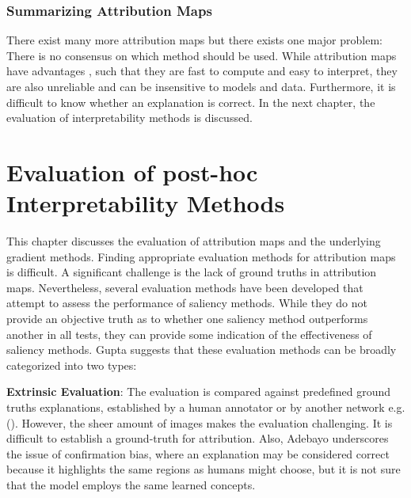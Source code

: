 
\subsection{Summarizing Attribution Maps}

There exist many more attribution maps but there exists one major problem: There is no consensus on which method should be used. While attribution maps have advantages \cite{molnar2022}, such that they are fast to compute and easy to interpret, they are also unreliable \cite{molnar2020} and can be insensitive to models and data. Furthermore, it is difficult to know whether an explanation is correct. In the next chapter, the evaluation of interpretability methods is discussed.

\newpage

\chapter{Evaluation of post-hoc Interpretability Methods}
\label{sec:evaluation}


This chapter discusses the evaluation of attribution maps and the underlying gradient methods. Finding appropriate evaluation methods for attribution maps is difficult. A significant challenge is the lack of ground truths in attribution maps. Nevertheless, several evaluation methods have been developed that attempt to assess the performance of saliency methods. While they do not provide an objective truth as to whether one saliency method outperforms another in all tests, they can provide some indication of the effectiveness of saliency methods. Gupta\cite{gupta2022new} suggests that these evaluation methods can be broadly categorized into two types:

\textbf{Extrinsic Evaluation}: 
The evaluation is compared against predefined ground truths explanations, established by a human annotator or by another network e.g.(\cite{zhang2018}). However, the sheer amount of images makes the evaluation challenging. It is difficult to establish a ground-truth for attribution. Also, Adebayo \cite{adebayo2020sanity} underscores the issue of confirmation bias, where an explanation may be considered correct because it highlights the same regions as humans might choose, but it is not sure that the model employs the same learned concepts. 

